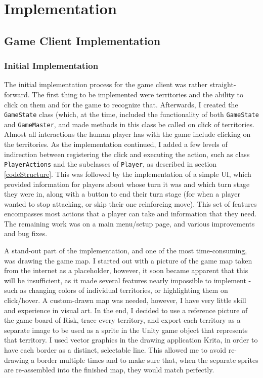 \graphicspath{ {./Images/} }
\chapter{Implementation}
\section{Game Client Implementation}
\label{gameClientImplementation}
\subsection{Initial Implementation}
\label{initialImplementation}
The initial implementation process for the game client was rather straight-forward. The first thing to be implemented were territories and the ability to click on them and for the game to recognize that. Afterwards, I created the \texttt{GameState} class (which, at the time, included the functionality of both \texttt{GameState} and \texttt{GameMaster}, and made methods in this class be called on click of territories. Almost all interactions the human player has with the game include clicking on the territories. As the implementation continued, I added a few levels of indirection between registering the click and executing the action, such as class \texttt{PlayerActions} and the subclasses of \texttt{Player}, as described in section \ref{codeStructure}. This was followed by the implementation of a simple UI, which provided information for players about whose turn it was and which turn stage they were in, along with a button to end their turn stage (for when a player wanted to stop attacking, or skip their one reinforcing move). This set of features encompasses most actions that a player can take and information that they need. The remaining work was on a main menu/setup page, and various improvements and bug fixes.

A stand-out part of the implementation, and one of the most time-consuming, was drawing the game map. I started out with a picture of the game map taken from the internet as a placeholder, however, it soon became apparent that this will be insufficient, as it made several features nearly impossible to implement - such as changing colors of individual territories, or highlighting them on click/hover. A custom-drawn map was needed, however, I have very little skill and experience in visual art. In the end, I decided to use a reference picture of the game board of Risk, trace every territory, and export each territory as a separate image to be used as a sprite in the Unity game object that represents that territory. I used vector graphics in the drawing application Krita, in order to have each border as a distinct, selectable line. This allowed me to avoid re-drawing a border multiple times and to make sure that, when the separate sprites are re-assembled into the finished map, they would match perfectly.

